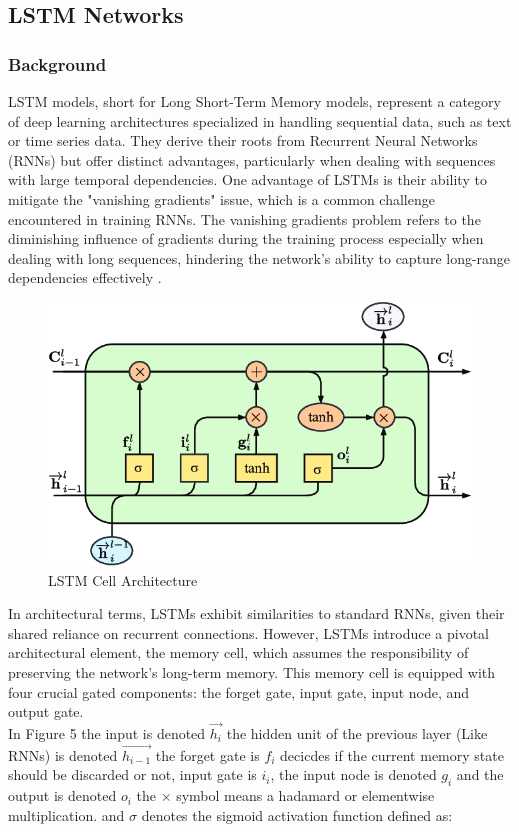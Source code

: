 \documentclass{article}
\begin{document}
\subsection{LSTM Networks}
\subsubsection{Background}

LSTM models, short for Long Short-Term Memory models, represent a category of deep learning architectures specialized in handling sequential data, such as text or time series data. They derive their roots from Recurrent Neural Networks (RNNs) but offer distinct advantages, particularly when dealing with sequences with large temporal dependencies. One advantage of LSTMs is their ability to mitigate the "vanishing gradients" issue, which is a common challenge encountered in training RNNs. The vanishing gradients problem refers to the diminishing influence of gradients during the training process especially when dealing with long sequences, hindering the network's ability to capture long-range dependencies effectively \cite{zhang2023}. \\

\begin{figure}
    \centering
    \includegraphics[width=0.5\linewidth]{LSTM.png}
    \caption{LSTM Cell Architecture}
    \label{fig:LSTM Diagram}
\end{figure}

In architectural terms, LSTMs exhibit similarities to standard RNNs, given their shared reliance on recurrent connections. However, LSTMs introduce a pivotal architectural element, the memory cell, which assumes the responsibility of preserving the network's long-term memory. This memory cell is equipped with four crucial gated components: the forget gate, input gate, input node, and output gate. \\

In Figure 5 the input is denoted $\Vec{h_i}$ the hidden unit of the previous layer (Like RNNs) is denoted $\vec{h_{i-1}}$ the forget gate is $f_i$ decicdes if the current memory state should be discarded or not, input gate is $i_i$, the input node is denoted $g_i$ and the output is denoted $o_i$ the $\times$ symbol means a hadamard or elementwise multiplication. and $\sigma$ denotes the sigmoid activation function defined as:\\
\end{document}
